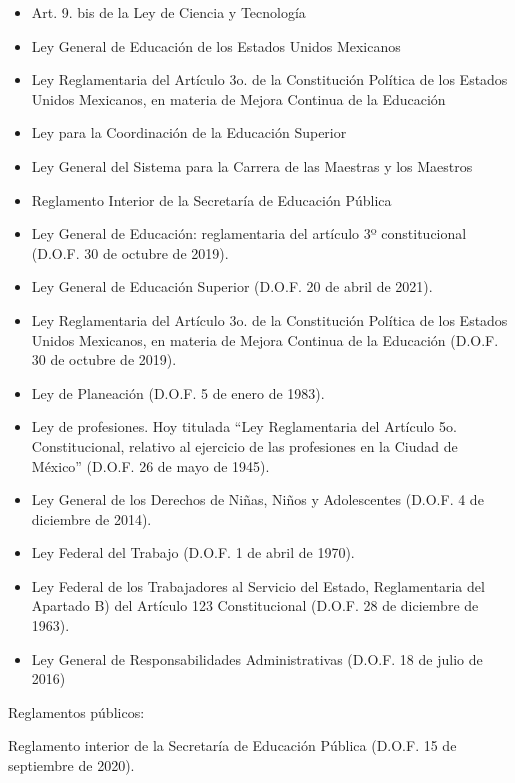 \documentclass[
  12,
]{scrartcl}
\begin{document}
\begin{itemize}
\item
  Art. 9. bis de la Ley de Ciencia y Tecnología
\item
  Ley General de Educación de los Estados Unidos Mexicanos
\item
  Ley Reglamentaria del Artículo 3o. de la Constitución Política de los
  Estados Unidos Mexicanos, en materia de Mejora Continua de la
  Educación
\item
  Ley para la Coordinación de la Educación Superior
\item
  Ley General del Sistema para la Carrera de las Maestras y los Maestros
\item
  Reglamento Interior de la Secretaría de Educación Pública
\item
  Ley General de Educación: reglamentaria del artículo 3º constitucional
  (D.O.F. 30 de octubre de 2019).
\item
  Ley General de Educación Superior (D.O.F. 20 de abril de 2021).
\item
  Ley Reglamentaria del Artículo 3o. de la Constitución Política de los
  Estados Unidos Mexicanos, en materia de Mejora Continua de la
  Educación (D.O.F. 30 de octubre de 2019).
\item
  Ley de Planeación (D.O.F. 5 de enero de 1983).
\item
  Ley de profesiones. Hoy titulada ``Ley Reglamentaria del Artículo 5o.
  Constitucional, relativo al ejercicio de las profesiones en la Ciudad
  de México'' (D.O.F. 26 de mayo de 1945).
\item
  Ley General de los Derechos de Niñas, Niños y Adolescentes (D.O.F. 4
  de diciembre de 2014).
\item
  Ley Federal del Trabajo (D.O.F. 1 de abril de 1970).
\item
  Ley Federal de los Trabajadores al Servicio del Estado, Reglamentaria
  del Apartado B) del Artículo 123 Constitucional (D.O.F. 28 de
  diciembre de 1963).
\item
  Ley General de Responsabilidades Administrativas (D.O.F. 18 de julio
  de 2016)
\end{itemize}

Reglamentos públicos:

Reglamento interior de la Secretaría de Educación Pública (D.O.F. 15 de
septiembre de 2020).
\end{document}
